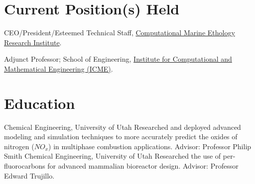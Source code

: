 \documentclass[letterpaper]{twentysecondcv_spd} %
\begin{document}
\section{Current Position(s) Held}

\begin{twentyshort}

	
	 {CEO/President/Esteemed Technical Staff, \href{https://comeri.org}{Computational Marine Ethology Research Institute}.}

  	 {Adjunct Professor; School of Engineering, \href{https://profiles.stanford.edu/stefan-domino}{Institute for Computational and Mathematical Engineering (ICME)}.}
		
  \end{twentyshort}
  
\section{Education}

\begin{twenty}
	 {\normalfont Chemical Engineering, University of Utah} {Researched and deployed advanced
modeling and simulation techniques to more accurately predict the oxides of nitrogen ($NO_x$) in multiphase combustion applications. Advisor: Professor Philip Smith}
	 {\normalfont Chemical Engineering, University of Utah} {Researched the use of per-fluorocarbons for advanced mammalian bioreactor design. Advisor: Professor Edward Trujillo.}
	
\end{twenty}

\end{document}
